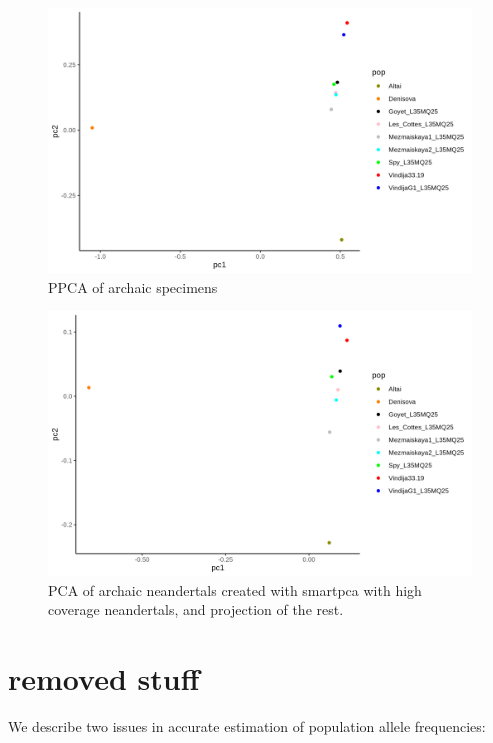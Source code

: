 \documentclass[12pt, letterpaper]{article}
\begin{document}
\begin{figure}[ht!]
    \includegraphics[width=16.5cm]{plots/neandertal_pca_smartpca.png}
    \centering
    \caption{PPCA of archaic specimens}
    \label{figS2:pc_scale}
\end{figure}

\begin{figure}[ht!]
    \includegraphics[width=16.5cm]{plots/neandertal_ppca.png}
    \centering
    \caption{PCA of archaic neandertals created with smartpca with high coverage neandertals, and projection of the rest.}
    \label{figS2:pc_scale}
\end{figure}


\section{removed stuff}

We describe two issues in accurate estimation of population allele frequencies:
\end{document}
